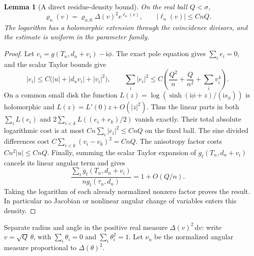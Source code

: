 \documentclass[11pt]{article}
\numberwithin{equation}{section}
\newtheorem{lemma}[theorem]{Lemma}
\theoremstyle{definition}
\newcommand{\ii}{\mathrm i}
\newcommand{\dd}{\,\mathrm d}
\begin{document}
\begin{lemma}[A direct residue-density bound]\label{neg:direct-density}
On the real ball \(Q<\sigma\),
\begin{equation}
 \varrho_n(v)=\varrho_{n,0}\Delta(v)^2e^{\ell_n(v)},
 \qquad |\ell_n(v)|\le CnQ.
 \label{neg:full-density}
\end{equation}
The logarithm has a holomorphic extension through the coincidence
divisors, and the estimate is uniform in the parameter family.
\end{lemma}
\begin{proof}
Let \(e_i=g(T_n,d_n+v_i)-\ii\phi\).  The exact pole equation
gives \(\sum_i e_i=0\), and the scalar Taylor bounds give
\[
 |e_i|\le C\bigl(|u|+|d_n v_i|+|v_i|^2\bigr),\qquad
 \sum_i|e_i|^2\le C\left(\frac{Q^2}{n}
                      +\frac{Q}{n^2}+\sum_i v_i^4\right).
\]
On a common small disk the function
\(L(z)=\log(\sinh(\ii\phi+z)/(\ii s_\phi))\) is holomorphic
and \(L(z)=L'(0)z+O(|z|^2)\).  Thus the linear parts in both
\(\sum_iL(e_i)\) and
\(2\sum_{i<k}L((e_i+e_k)/2)\) vanish exactly.  Their total
absolute logarithmic cost is at most
\(Cn\sum_i|e_i|^2\le CnQ\) on the fixed ball.
The sine divided differences cost
\(C\sum_{i<k}(v_i-v_k)^2=CnQ\).  The anisotropy factor costs
\(Cn^2|u|\le CnQ\).  Finally, summing the scalar Taylor expansion
of \(g_t(T_n,d_n+v_i)\) cancels its linear angular term and gives
\[
 \frac{\sum_i g_t(T_n,d_n+v_i)}{ng_t(\tau_n,d_n)}
       =1+O(Q/n).
\]
Taking the logarithm of each already normalized nonzero factor
proves the result.  In particular no Jacobian or nonlinear angular
change of variables enters this density.
\end{proof}

Separate radius and angle in the positive real measure
\(\Delta(v)^2\dd v\): write \(v=\sqrt Q\,\theta\), with
\(\sum_i\theta_i=0\) and \(\sum_i\theta_i^2=1\).  Let
\(\nu_n\) be the normalized angular measure proportional to
\(\Delta(\theta)^2\).
\end{document}
